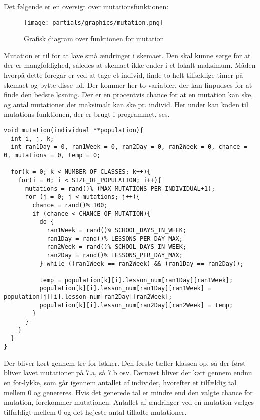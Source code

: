 Det følgende er en oversigt over mutationsfunktionen:
\begin{figure}[!h]
\texttt{[image: partials/graphics/mutation.png]}
\caption{Grafisk diagram over funktionen for mutation}
\label{fig:diagrammutation}
\end{figure}

Mutation er til for at lave små ændringer i skemaet. Den skal kunne sørge for at der er mangfoldighed, således at skemaet ikke ender i et lokalt maksimum. 
Måden hvorpå dette foregår er ved at tage et individ, finde to helt tilfældige timer på skemaet og bytte disse ud. Der kommer her to variabler, der kan finpudses for at finde den bedste løsning. Der er en procentvis chance for at en mutation kan ske, og antal mutationer der maksimalt kan ske pr. individ. 
Her under kan koden til mutations funktionen, der er brugt i programmet, ses.
\begin{lstlisting}
void mutation(individual **population){
  int i, j, k; 
  int ran1Day = 0, ran1Week = 0, ran2Day = 0, ran2Week = 0, chance = 0, mutations = 0, temp = 0;

  for(k = 0; k < NUMBER_OF_CLASSES; k++){
    for(i = 0; i < SIZE_OF_POPULATION; i++){
      mutations = rand()% (MAX_MUTATIONS_PER_INDIVIDUAL+1);
      for (j = 0; j < mutations; j++){
        chance = rand()% 100;
        if (chance < CHANCE_OF_MUTATION){
          do {
            ran1Week = rand()% SCHOOL_DAYS_IN_WEEK;
            ran1Day = rand()% LESSONS_PER_DAY_MAX;
            ran2Week = rand()% SCHOOL_DAYS_IN_WEEK;
            ran2Day = rand()% LESSONS_PER_DAY_MAX;
          } while ((ran1Week == ran2Week) && (ran1Day == ran2Day));
        
          temp = population[k][i].lesson_num[ran1Day][ran1Week];
          population[k][i].lesson_num[ran1Day][ran1Week] = population[j][i].lesson_num[ran2Day][ran2Week];
          population[k][i].lesson_num[ran2Day][ran2Week] = temp;
        }
      }
    }
  }
}
\end{lstlisting}

Der bliver kørt gennem tre for-løkker. Den første tæller klassen op, så der først bliver lavet mutationer på 7.a, så 7.b osv. Dernæst bliver der kørt gennem endnu en for-lykke, som går igennem antallet af individer, hvorefter et tilfældig tal mellem 0 og genereres. Hvis det generede tal er mindre end den valgte chance for mutation, forekommer mutationen. Antallet af ændringer ved en mutation vælges tilfældigt mellem 0 og det højeste antal tilladte mutationer. 